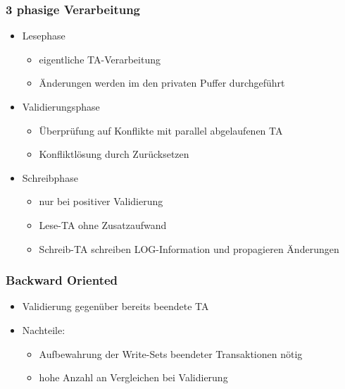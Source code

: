 \documentclass[a4paper]{article}
\begin{document}
    \subsubsection{3 phasige Verarbeitung}
    \begin{itemize}
        \item Lesephase
        
        \begin{itemize}
            \item eigentliche TA-Verarbeitung
            \item Änderungen werden im den privaten Puffer durchgeführt
        \end{itemize}
        
        \item Validierungsphase
        
        \begin{itemize}
            \item Überprüfung auf Konflikte mit parallel abgelaufenen TA
            \item Konfliktlösung durch Zurücksetzen
        \end{itemize}
        
        \item Schreibphase
        
        \begin{itemize}
            \item nur bei positiver Validierung
            \item Lese-TA ohne Zusatzaufwand
            \item Schreib-TA schreiben LOG-Information und propagieren Änderungen
        \end{itemize}
    \end{itemize}
    
    \subsubsection{Backward Oriented}
    \begin{itemize}
        \item Validierung gegenüber bereits beendete TA
        \item Nachteile:
        
        \begin{itemize}
            \item Aufbewahrung der Write-Sets beendeter Transaktionen nötig
            \item hohe Anzahl an Vergleichen bei Validierung
        \end{itemize}
        
    \end{itemize}
    
\end{document}
